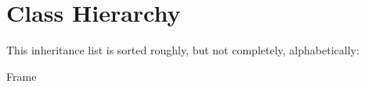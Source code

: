 \section{Class Hierarchy}
This inheritance list is sorted roughly, but not completely, alphabetically\+:\begin{DoxyCompactList}
\item Frame\begin{DoxyCompactList}
\item {}
\end{DoxyCompactList}
\end{DoxyCompactList}
